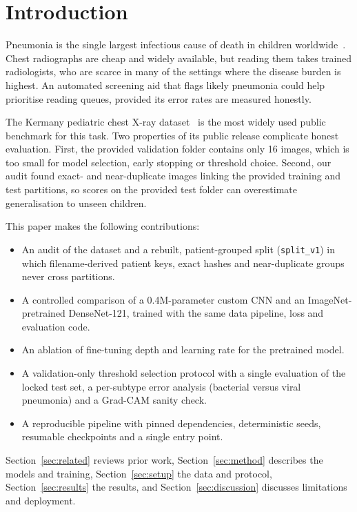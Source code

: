 \documentclass[conference]{IEEEtran}
\begin{document}
\section{Introduction}
\label{sec:intro}
Pneumonia is the single largest infectious cause of death in children worldwide~\cite{who-pneumonia}. Chest radiographs are cheap and widely available, but reading them takes trained radiologists, who are scarce in many of the settings where the disease burden is highest. An automated screening aid that flags likely pneumonia could help prioritise reading queues, provided its error rates are measured honestly.

The Kermany pediatric chest X-ray dataset~\cite{kermany2018,kermany-data} is the most widely used public benchmark for this task. Two properties of its public release complicate honest evaluation. First, the provided validation folder contains only 16 images, which is too small for model selection, early stopping or threshold choice. Second, our audit found exact- and near-duplicate images linking the provided training and test partitions, so scores on the provided test folder can overestimate generalisation to unseen children.

This paper makes the following contributions:
\begin{itemize}
\item An audit of the dataset and a rebuilt, patient-grouped split (\texttt{split\_v1}) in which filename-derived patient keys, exact hashes and near-duplicate groups never cross partitions.
\item A controlled comparison of a 0.4M-parameter custom CNN and an ImageNet-pretrained DenseNet-121, trained with the same data pipeline, loss and evaluation code.
\item An ablation of fine-tuning depth and learning rate for the pretrained model.
\item A validation-only threshold selection protocol with a single evaluation of the locked test set, a per-subtype error analysis (bacterial versus viral pneumonia) and a Grad-CAM sanity check.
\item A reproducible pipeline with pinned dependencies, deterministic seeds, resumable checkpoints and a single entry point.
\end{itemize}

Section~\ref{sec:related} reviews prior work, Section~\ref{sec:method} describes the models and training, Section~\ref{sec:setup} the data and protocol, Section~\ref{sec:results} the results, and Section~\ref{sec:discussion} discusses limitations and deployment.
\end{document}
